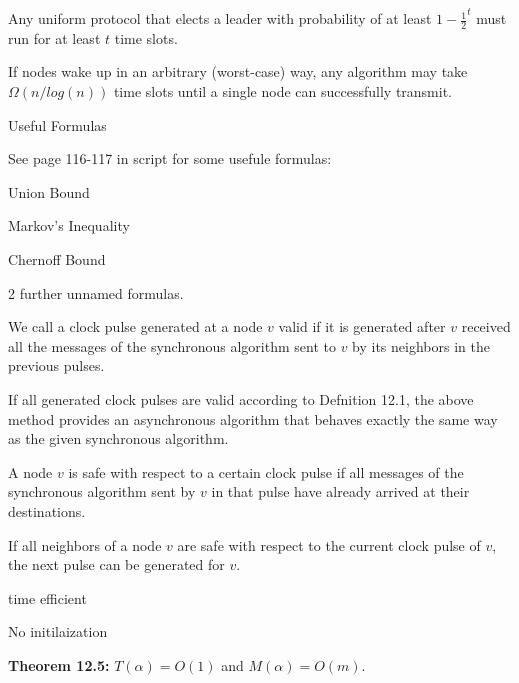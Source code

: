 {
	Any uniform protocol that elects a leader with probability of at least $1-{\frac{1}{2}}^t$ 
	must run for at least $t$ time slots.
}

{
	If nodes wake up in an arbitrary (worst-case) way, any algorithm may take 
	$\Omega(n/log(n))$ time slots until a single node can successfully transmit.
}

{\LARGE Useful Formulas}

See page 116-117 in script for some usefule formulas:
\begin{items}
	\item Union Bound
	\item Markov's Inequality
	\item Chernoff Bound
	\item 2 further unnamed formulas.
\end{items}


{
	We call a clock pulse generated at a node $v$ valid if it is generated after $v$ 
	received all the messages of the synchronous algorithm sent to $v$ by its 
	neighbors in the previous pulses.
}

{
	If all generated clock pulses are valid according to Defnition 12.1, 
	the above method provides an asynchronous algorithm that behaves exactly 
	the same way as the given synchronous algorithm.
}

{
	A node $v$ is safe with respect to a certain clock pulse if all messages 
	of the synchronous algorithm sent by $v$ in that pulse have already 
	arrived at their destinations.
}

{
	If all neighbors of a node $v$ are safe with respect to the current 
	clock pulse of $v$, the next pulse can be generated for $v$.
}

{
	\begin{items}
		\item time efficient
		\item No initilaization
		\item {\bf Theorem 12.5:} $T(\alpha)=O(1)$ and $M(\alpha)=O(m)$.
	\end{items}
}

